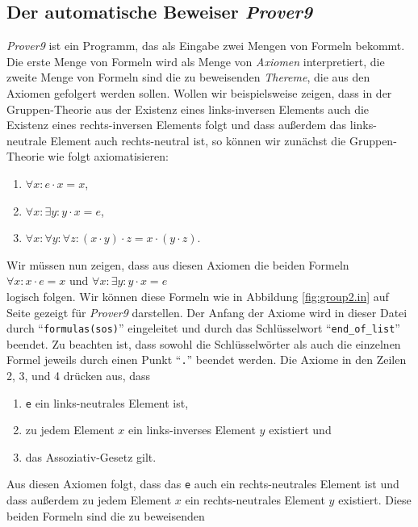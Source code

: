 \subsection{Der automatische Beweiser \textsl{Prover9}}
\textsl{Prover9} ist ein Programm, das als Eingabe zwei Mengen von Formeln bekommt.  Die erste Menge von
Formeln wird als Menge von \emph{Axiomen} interpretiert, die zweite Menge von Formeln sind die zu
beweisenden \emph{Thereme}, die aus den Axiomen gefolgert werden sollen.  Wollen wir beispielsweise zeigen,
dass in der Gruppen-Theorie aus der Existenz eines  links-inversen Elements auch die Existenz eines
rechts-inversen Elements folgt und dass außerdem das links-neutrale Element auch rechts-neutral ist,
so können wir zunächst die Gruppen-Theorie wie folgt axiomatisieren:
\begin{enumerate}
\item $\forall x: e \cdot x = x$,
\item $\forall x: \exists y: y \cdot x = e$,
\item $\forall x: \forall y: \forall z: (x \cdot y) \cdot z = x \cdot (y \cdot z)$.
\end{enumerate}
Wir müssen nun zeigen, dass aus diesen Axiomen die beiden Formeln
\\[0.2cm]
\hspace*{1.3cm}
$\forall x: x \cdot e = x$ \quad und \quad $\forall x: \exists y: y \cdot x = e$ 
\\[0.2cm]
logisch folgen.  Wir können diese Formeln wie in Abbildung \ref{fig:group2.in} auf Seite
\pageref{fig:group2.in} gezeigt für \textsl{Prover9} darstellen.
Der Anfang der Axiome wird in dieser Datei durch ``\texttt{formulas(sos)}'' eingeleitet und durch
das Schlüsselwort ``\texttt{end\_of\_list}'' beendet.  Zu beachten ist, dass sowohl die Schlüsselwörter als
auch die einzelnen Formel jeweils durch einen Punkt ``\texttt{.}'' beendet werden.  Die Axiome in den Zeilen
2, 3, und 4 drücken aus, dass 
\begin{enumerate}
\item \texttt{e} ein links-neutrales Element ist,
\item zu jedem Element $x$ ein links-inverses Element $y$ existiert und
\item das Assoziativ-Gesetz gilt.
\end{enumerate}
Aus diesen Axiomen folgt, dass das \texttt{e} auch ein rechts-neutrales Element ist und dass außerdem zu
jedem Element $x$ ein rechts-neutrales Element $y$ existiert.  Diese beiden  Formeln sind die zu beweisenden 
